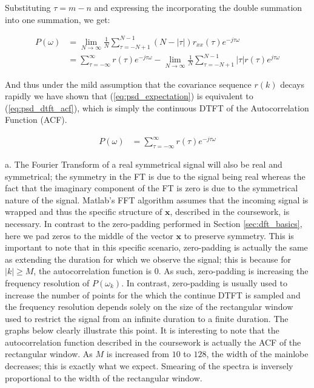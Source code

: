 \noindent{}Substituting $\tau=m-n$ and expressing the incorporating the double summation into one summation, we get:

\begin{align}
P(\omega)	&=\lim_{N \to \infty} \frac{1}{N} \sum_{\tau=-N+1}^{N-1}  (N-\lvert \tau \rvert) r_{xx}(\tau) e^{-j\tau\omega} \nonumber \\
			&=\sum_{\tau=-\infty}^{\infty}r(\tau)e^{-j\tau\omega} - \lim_{N \to \infty} \frac{1}{N} \sum_{\tau=-N+1}^{N-1} \lvert \tau \rvert r(\tau) e^{j\tau\omega} \nonumber
\end{align}

\noindent{}And thus under the mild assumption that the covariance sequence $r(k)$ decays rapidly we have shown that (\ref{eq:psd_expectation}) is equivalent to (\ref{eq:psd_dtft_acf}), which is simply the continuous DTFT of the Autocorrelation Function (ACF).

\begin{align}
P(\omega)	&= \sum_{\tau=-\infty}^{\infty}r(\tau)e^{-j\tau\omega} \label{eq:psd_dtft_acf}
\end{align}  


\noindent{}a. The Fourier Transform of a real symmetrical signal will also be real and symmetrical; the symmetry in the FT is due to the signal being real whereas the fact that the imaginary component of the FT is zero is due to the symmetrical nature of the signal. Matlab's FFT algorithm assumes that the incoming signal is wrapped and thus the specific structure of $\textbf{x}$, described in the coursework, is necessary. In contrast to the zero-padding performed in Section \ref{sec:dft_basics}, here we pad zeros to the middle of the vector $\textbf{x}$ to preserve symmetry. This is important to note that in this specific scenario, zero-padding is actually the same as extending the duration for which we observe the signal; this is because for $|k|\geq M$, the autocorrelation function is $0$. As such, zero-padding is increasing the frequency resolution of $P(\omega_{k})$. In contrast, zero-padding is usually used to increase the number of points for the which the continue DTFT is sampled and the frequency resolution depends solely on the size of the rectangular window used to restrict the signal from an infinite duration to a finite duration. The graphs below clearly illustrate this point. It is interesting to note that the autocorrelation function described in the coursework is actually the ACF of the rectangular window. As $M$ is increased from $10$ to $128$, the width of the mainlobe decreases; this is exactly what we expect. Smearing of the spectra is inversely proportional to the width of the rectangular window.


